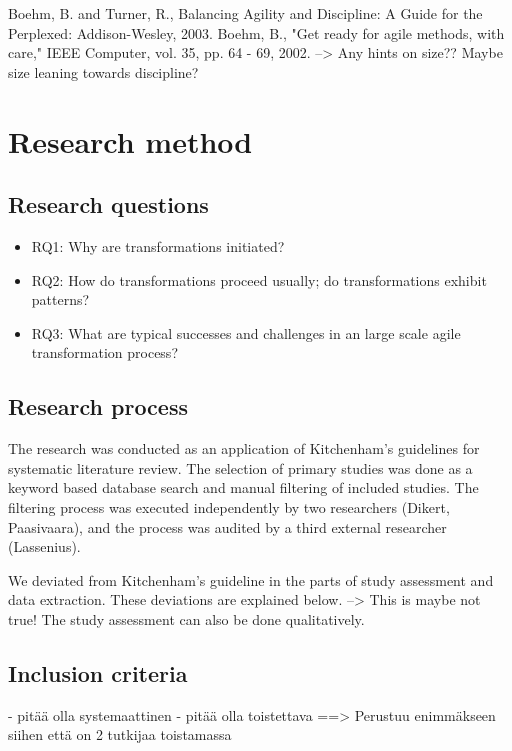 \documentclass[preprint,authoryear,12pt]{elsarticle}
\begin{document}
Boehm, B. and Turner, R., Balancing Agility and Discipline: A Guide for the
Perplexed: Addison-Wesley, 2003.
Boehm, B., "Get ready for agile methods, with care," IEEE Computer, vol. 35,
pp. 64 - 69, 2002.
--> Any hints on size?? Maybe size leaning towards discipline?


\section{Research method}
\label{sec:method}

\subsection{Research questions}

\begin{itemize}

\item
RQ1: Why are transformations initiated?

\item
RQ2: How do transformations proceed usually; do transformations exhibit patterns?

\item
RQ3: What are typical successes and challenges in an large scale agile
    transformation process?

\end{itemize}

\subsection{Research process}

The research was conducted as an application of Kitchenham's
\cite{Kitchenham2007} guidelines for systematic literature review. The selection
of primary studies was done as a keyword based database search and manual
filtering of included studies. The filtering process was executed independently
by two researchers (Dikert, Paasivaara), and the process was audited by a third
external researcher (Lassenius).

We deviated from Kitchenham's guideline in the parts of study assessment and
data extraction. These deviations are explained below.
--> This is maybe not true! The study assessment can also be done qualitatively.


\subsection{Inclusion criteria}
- pitää olla systemaattinen
- pitää olla toistettava
==> Perustuu enimmäkseen siihen että on 2 tutkijaa toistamassa
\end{document}

